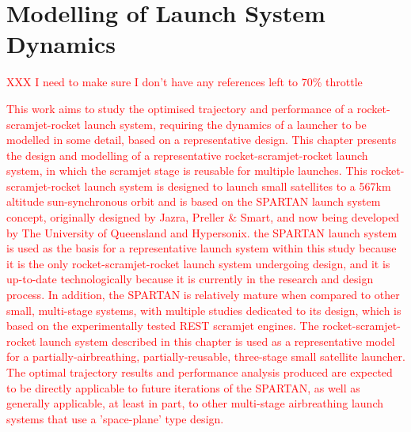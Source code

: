 
\cleardoublepage
\chapter{Modelling of Launch System Dynamics}\label{chapter:Design}

\textcolor{red}{ XXX I need to make sure I don’t have any references left to 70\% throttle}

\textcolor{red}{This work aims to study the optimised trajectory and performance of a rocket-scramjet-rocket launch system, requiring the dynamics of a launcher to be modelled in some detail, based on a representative design.
	This chapter presents the design and modelling of a representative rocket-scramjet-rocket launch system, in which the scramjet stage is reusable for multiple launches. 
		This rocket-scramjet-rocket launch system is designed to launch small satellites to a 567km altitude sun-synchronous orbit and is based on the SPARTAN launch system concept, originally designed by Jazra, Preller \& Smart\cite{Preller2017b,Jazra2013}, and now being developed by The University of Queensland and Hypersonix.
		the SPARTAN launch system is used as the basis for a representative launch system within this study because it is the only rocket-scramjet-rocket launch system undergoing design, 
		 and it is up-to-date technologically because it is currently in the research and design process. In addition, the SPARTAN is relatively mature when compared to other small, multi-stage systems, with multiple studies dedicated to its design, which is based on the experimentally tested REST scramjet engines.   
	The rocket-scramjet-rocket launch system described in this chapter is used as a representative model for a partially-airbreathing, partially-reusable, three-stage small satellite launcher. The optimal trajectory results and performance analysis produced are expected to be directly applicable to future iterations of the SPARTAN, as well as generally applicable, at least in part, to other multi-stage airbreathing launch systems that use a 'space-plane' type design. }
	
